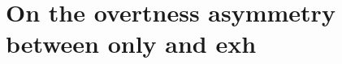 \documentclass[12pt]{report}
\author{Adèle Hénot-Mortier}
\begin{document}
	\tableofcontents

\onehalfspacing


%

%

%

%

\chapter{On the overtness asymmetry between only and exh}




\end{document}
